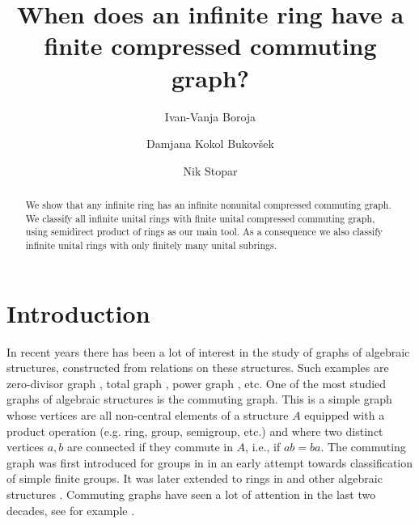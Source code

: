 \documentclass[12pt,a4paper]{amsart}
\theoremstyle{definition}
\begin{document}
\title{When does an infinite ring have a finite compressed commuting graph?}

\author[I.-V. Boroja]{Ivan-Vanja Boroja }
\address{University of Banja Luka, Faculty of Electrical Engineering, Bosnia and Herzegovina}

\author[D. Kokol Bukov\v sek]{Damjana Kokol Bukov\v{s}ek }
\address{University of Ljubljana, School of Economics and Business, and Institute of Mathematics, Physics and Mechanics, Ljubljana, Slovenia}


\author[N. Stopar]{Nik Stopar }
\address{University of Ljubljana, Faculty of Civil and Geodetic Engineering, University of Ljublja\-na, Faculty of Mathematics and Physics, and Institute of Mathematics, Physics and Mechanics, Ljubljana, Slovenia}


\begin{abstract}
We show that any infinite ring has an infinite nonunital compressed commuting graph. We classify all infinite unital rings with finite unital compressed commuting graph, using semidirect product of rings as our main tool.
As a consequence we also classify infinite unital rings with only finitely many unital subrings.
\end{abstract}



\maketitle

\section{Introduction}\label{sec:intro}

In recent years there has been a lot of interest in the study of graphs of algebraic structures, constructed from relations on these structures. Such examples are zero-divisor graph \cite{AnLi}, total graph \cite{AnBa}, power graph \cite{AbKeCh}, etc. One of the most studied graphs of algebraic structures is the commuting graph. This is a simple graph whose vertices are all non-central elements of a structure $A$ equipped with a product operation (e.g. ring, group, semigroup, etc.) and where two distinct vertices $a, b$ are connected if they commute in $A$, i.e., if $ab = ba$. The commuting graph was first introduced for groups in \cite{BrFo} in an early attempt towards classification of simple finite groups. It was later extended to rings in \cite{AkGhHaMo04} and other algebraic structures \cite{ArKiKo, WaXi}. Commuting graphs have seen a lot of attention in the last two decades, see for example \cite{AkBiMo, DoD19, DoKoKu18, DoMa24, Ku18}. 
\end{document}
